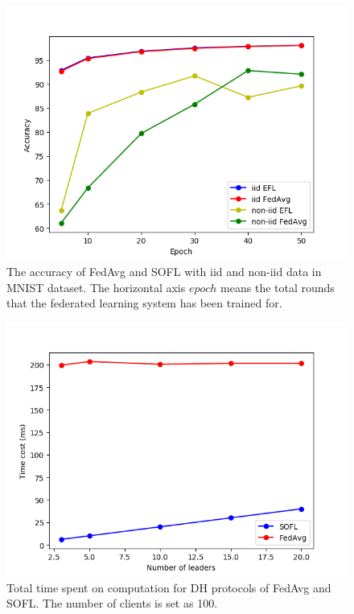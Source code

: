 \begin{figure}[!ht]
    \centering
    \includegraphics[width=\columnwidth]{img/acc.png}
    \caption{The accuracy of FedAvg and SOFL with iid and non-iid data in MNIST dataset. The horizontal axis $epoch$ means the total rounds that the federated learning system has been trained for.}
    \label{acc}
\end{figure}

\begin{figure}[!ht]
    \centering
    \includegraphics[width=\columnwidth]{img/leader-time.png}
    \caption{Total time spent on computation for DH protocols of FedAvg and SOFL. The number of clients is set as 100.}
    \label{leader-time}
\end{figure}

